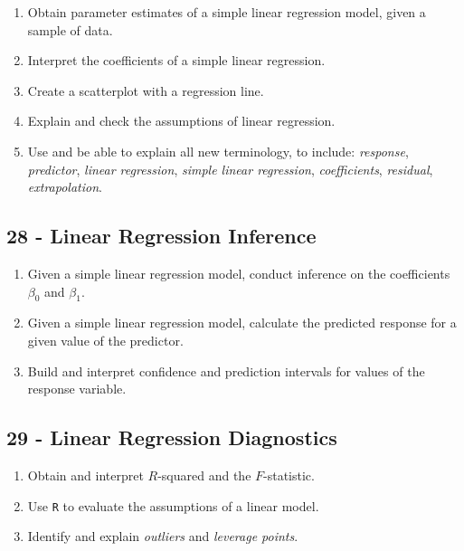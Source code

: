 \documentclass[
  letterpaper,
  DIV=11,
  numbers=noendperiod]{scrreprt}
\begin{document}
\begin{enumerate}
\def\labelenumi{\arabic{enumi})}
\item
  Obtain parameter estimates of a simple linear regression model, given
  a sample of data.
\item
  Interpret the coefficients of a simple linear regression.
\item
  Create a scatterplot with a regression line.
\item
  Explain and check the assumptions of linear regression.
\item
  Use and be able to explain all new terminology, to include:
  \emph{response}, \emph{predictor}, \emph{linear regression},
  \emph{simple linear regression}, \emph{coefficients}, \emph{residual},
  \emph{extrapolation}.
\end{enumerate}

\subsection*{28 - Linear Regression
Inference}\label{linear-regression-inference}

\begin{enumerate}
\def\labelenumi{\arabic{enumi})}
\item
  Given a simple linear regression model, conduct inference on the
  coefficients \(\beta_0\) and \(\beta_1\).
\item
  Given a simple linear regression model, calculate the predicted
  response for a given value of the predictor.
\item
  Build and interpret confidence and prediction intervals for values of
  the response variable.
\end{enumerate}

\subsection*{29 - Linear Regression
Diagnostics}\label{linear-regression-diagnostics}

\begin{enumerate}
\def\labelenumi{\arabic{enumi})}
\item
  Obtain and interpret \(R\)-squared and the \(F\)-statistic.
\item
  Use \texttt{R} to evaluate the assumptions of a linear model.
\item
  Identify and explain \emph{outliers} and \emph{leverage points}.
\end{enumerate}
\end{document}
